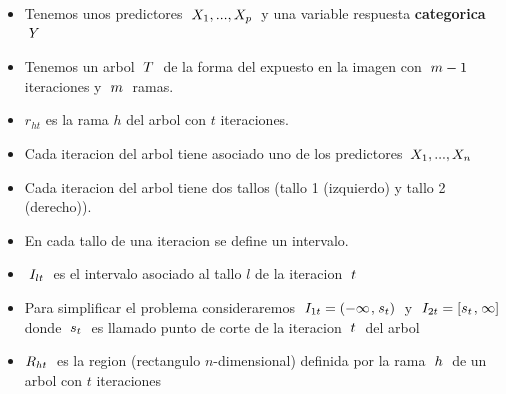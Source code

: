 \documentclass[
  11pt,
  a4paper,
]{article}
\begin{document}
\begin{itemize}
\item
  Tenemos unos predictores \(\hspace{0.1cm} X_1,...,X_p \hspace{0.1cm}\)
  y una variable respuesta \textbf{categorica} \(\hspace{0.1cm} Y\)
\item
  Tenemos un arbol \(\hspace{0.1cm} T \hspace{0.1cm}\) de la forma del
  expuesto en la imagen con \(\hspace{0.1cm} m-1 \hspace{0.1cm}\)
  iteraciones y \(\hspace{0.1cm} m \hspace{0.1cm}\) ramas.
\item
  \(r_{ht}\) es la rama \(h\) del arbol con \(t\) iteraciones.
\item
  Cada iteracion del arbol tiene asociado uno de los predictores
  \(\hspace{0.07cm} X_1,...,X_n\)
\item
  Cada iteracion del arbol tiene dos tallos (tallo 1 (izquierdo) y tallo
  2 (derecho)).
\item
  En cada tallo de una iteracion se define un intervalo.
\item
  \(\hspace{0.1cm} I_{lt} \hspace{0.1cm}\) es el intervalo asociado al
  tallo \(l\) de la iteracion \(\hspace{0.1cm} t\)
\item
  Para simplificar el problema consideraremos
  \(\hspace{0.1cm} I_{1t} = (-\infty \hspace{0.03cm},\hspace{0.03cm} s_t)\hspace{0.1cm}\)
  y
  \(\hspace{0.1cm} I_{2t} = [s_t \hspace{0.03cm},\hspace{0.03cm} \infty]\hspace{0.1cm}\)
  donde \(\hspace{0.1cm} s_t \hspace{0.1cm}\) es llamado punto de corte
  de la iteracion \(\hspace{0.1cm} t \hspace{0.1cm}\) del arbol
\item
  \(R_{ht} \hspace{0.1cm}\) es la region (rectangulo \(n\)-dimensional)
  definida por la rama \(\hspace{0.1cm} h \hspace{0.1cm}\) de un arbol
  con \(t\) iteraciones
\end{itemize}
\end{document}
